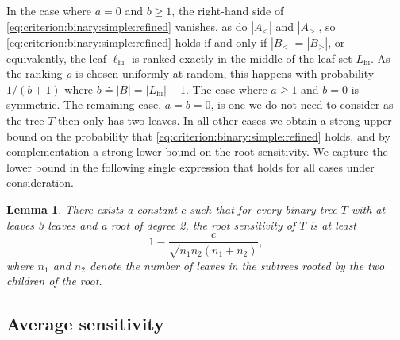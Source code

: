 \documentclass[11pt]{article}
\numberwithin{equation}{section}
\newtheorem{lemma}[theorem]{Lemma}
\theoremstyle{definition}
\theoremstyle{plain}
\newcommand{\ranking}{\rho}
\newcommand{\hi}{\mathrm{hi}}
\begin{document}
In the case where $a = 0$ and $b \ge 1$, the right-hand side of
\eqref{eq:criterion:binary:simple:refined} vanishes, as do $|A_<|$ and $|A_>|$, so \eqref{eq:criterion:binary:simple:refined} holds if and only if $|B_<| = |B_>|$, or equivalently, the leaf $\ell_\hi$ is ranked exactly in the middle of the leaf set $L_\hi$. As the ranking $\ranking$ is chosen uniformly at random, this happens with probability $1/(b+1)$ where $b \doteq |B| = |L_\hi|-1$. The case where $a \ge 1$ and $b=0$ is symmetric. The remaining case, $a=b=0$, is one we do not need to consider as the tree $T$ then only has two leaves. In all other cases we obtain a strong upper bound on the probability that \eqref{eq:criterion:binary:simple:refined} holds, and by complementation a strong lower bound on the root sensitivity. We capture the lower bound in the following single expression that holds for all cases under consideration.
\begin{lemma}\label{lemma:sensitivity:root}
There exists a constant $c$ such that for every binary tree $T$ with at leaves 3 leaves and a root of degree 2, the root sensitivity of $T$ is at least 
\begin{equation}\label{eq:root:bound}
1 - \frac{c}{\sqrt{n_1 n_2 (n_1+n_2)}},
\end{equation}
where $n_1$ and $n_2$ denote the number of leaves in the subtrees rooted by the two children of the root.
\end{lemma}

\subsection{Average sensitivity}
\label{sec:sensitivity:average}
\end{document}
